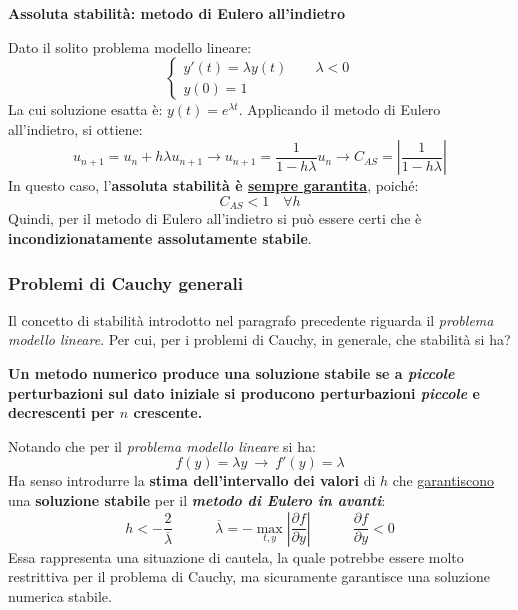 \highspace
\begin{flushleft}
	\textcolor{Red2}{ \textbf{Assoluta stabilità: metodo di Eulero all'indietro}}
\end{flushleft}
Dato il solito problema modello lineare:
\begin{equation*}
	\begin{cases}
		y'\left(t\right) = \lambda y\left(t\right) \hspace{2em} \lambda < 0 \\
		y\left(0\right) = 1
	\end{cases}
\end{equation*}
La cui soluzione esatta è: $y\left(t\right) = e^{\lambda t}$. Applicando il metodo di Eulero all'indietro, si ottiene:
\begin{equation*}
	u_{n+1} = u_{n} + h\lambda u_{n+1} \rightarrow u_{n+1} = \dfrac{1}{1-h\lambda} u_{n} \rightarrow C_{AS} = \left|\dfrac{1}{1-h\lambda}\right|
\end{equation*}
In questo caso, l'\textbf{assoluta stabilità è \underline{sempre garantita}}, poiché:
\begin{equation*}
	C_{AS} < 1 \hspace{1em} \forall h
\end{equation*}
Quindi, per il metodo di Eulero all'indietro si può essere certi che è \textbf{incondizionatamente assolutamente stabile}.

\newpage

\subsubsection{Problemi di Cauchy generali}

Il concetto di stabilità introdotto nel paragrafo precedente riguarda il \emph{problema modello lineare}. Per cui, per i problemi di Cauchy, in generale, che stabilità si ha?

\highspace
\textbf{Un metodo numerico produce una soluzione stabile se a \emph{piccole} perturbazioni sul dato iniziale si producono perturbazioni \emph{piccole} e decrescenti per $n$ crescente.}

\highspace
Notando che per il \emph{problema modello lineare} si ha:
\begin{equation*}
	f\left(y\right) = \lambda y \: \rightarrow \: f'\left(y\right) = \lambda
\end{equation*}
Ha senso introdurre la \textbf{stima dell'intervallo dei valori} di $h$ che \underline{garantiscono} una \textbf{soluzione stabile} per il \textbf{\emph{metodo di Eulero in avanti}}:
\begin{equation}
	h < -\dfrac{2}{\overline{\lambda}} \hspace{3em} \overline{\lambda} = - \underset{t,y}{\max} \left|\dfrac{\partial f}{\partial y}\right| \hspace{3em} \dfrac{\partial f}{\partial y} < 0
\end{equation}
Essa rappresenta una situazione di cautela, la quale potrebbe essere molto restrittiva per il problema di Cauchy, ma sicuramente garantisce una soluzione numerica stabile.

